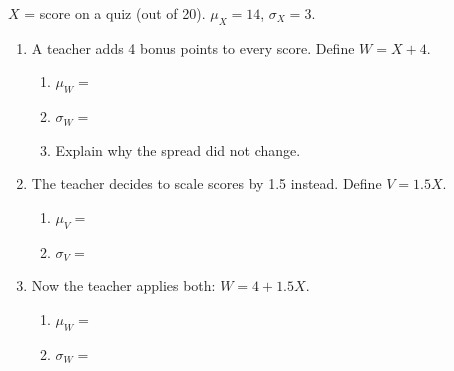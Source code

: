 \documentclass[10pt]{article}
\begin{document}
\namepartnerperiod

\vspace{0.1in}

\begin{tcolorbox}[colback=sky!60, colframe=navy, title=\textbf{Tier R --- Remediate},
    arc=2mm, boxrule=0.8pt, left=4mm, right=4mm, top=3mm, bottom=3mm]
\small
$X$ = score on a quiz (out of 20). $\mu_X = 14$, $\sigma_X = 3$.

\begin{enumerate}[leftmargin=1.5em, itemsep=10pt]
  \item A teacher adds 4 bonus points to every score. Define $W = X + 4$.
        \begin{enumerate}[label=(\alph*), itemsep=6pt]
          \item $\mu_W = $ \blank{4cm}
          \item $\sigma_W = $ \blank{4cm}
          \item Explain why the spread did not change.\\
                \writeline
        \end{enumerate}

  \item The teacher decides to scale scores by 1.5 instead. Define $V = 1.5X$.
        \begin{enumerate}[label=(\alph*), itemsep=6pt]
          \item $\mu_V = $ \blank{4cm}
          \item $\sigma_V = $ \blank{4cm}
        \end{enumerate}

  \item Now the teacher applies both: $W = 4 + 1.5X$.
        \begin{enumerate}[label=(\alph*), itemsep=6pt]
          \item $\mu_W = $ \blank{4cm}
          \item $\sigma_W = $ \blank{4cm}
        \end{enumerate}
\end{enumerate}
\end{tcolorbox}

\vspace{0.12in}
\end{document}
